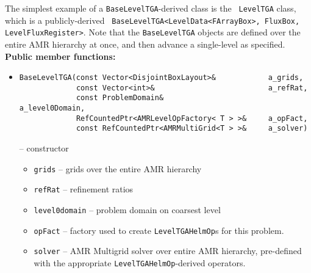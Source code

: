 The simplest example of a {\tt BaseLevelTGA}-derived class is the {\tt
  LevelTGA} class, which is a publicly-derived {\tt
  BaseLevelTGA<LevelData<FArrayBox>, FluxBox, LevelFluxRegister>}. 
Note that the {\tt BaseLevelTGA} objects are defined over the entire
AMR hierarchy at once, and then advance a single-level as specified. \\
{\bf Public member functions:}
\begin{itemize}

\item
\begin{verbatim}
BaseLevelTGA(const Vector<DisjointBoxLayout>&            a_grids,
             const Vector<int>&                          a_refRat,
             const ProblemDomain&                        a_level0Domain,
             RefCountedPtr<AMRLevelOpFactory< T > >&     a_opFact,
             const RefCountedPtr<AMRMultiGrid<T > >&     a_solver)
\end{verbatim}
-- constructor
\begin{itemize}
\item {\tt grids} -- grids over the entire AMR hierarchy
\item {\tt refRat} -- refinement ratios
\item {\tt level0domain} -- problem domain on coarsest level
\item {\tt opFact} -- factory used to create {\tt LevelTGAHelmOp}s for
  this problem. 
\item {\tt solver} -- AMR Multigrid solver over entire AMR hierarchy,
  pre-defined with the appropriate {\tt LevelTGAHelmOp}-derived operators.
\end{itemize}


\end{itemize}
